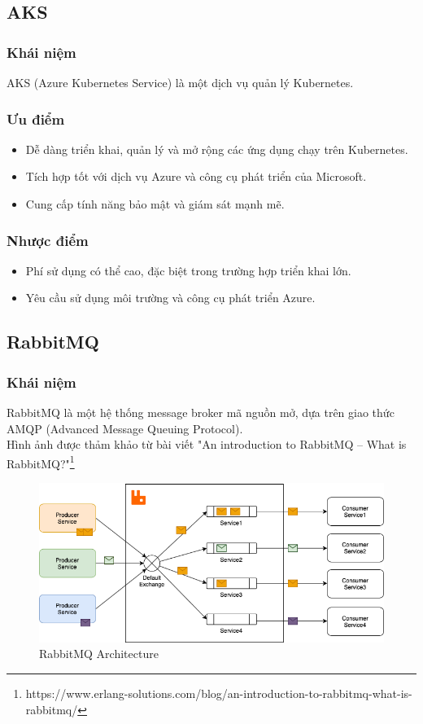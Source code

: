 \subsection{AKS}
\subsubsection{Khái niệm}
\indent AKS (Azure Kubernetes Service) là một dịch vụ quản lý Kubernetes.

\subsubsection{Ưu điểm}
\begin{itemize}
    \item Dễ dàng triển khai, quản lý và mở rộng các ứng dụng chạy trên Kubernetes.
    \item Tích hợp tốt với dịch vụ Azure và công cụ phát triển của Microsoft.
    \item Cung cấp tính năng bảo mật và giám sát mạnh mẽ.
\end{itemize}
\subsubsection{Nhược điểm}
\begin{itemize}
    \item Phí sử dụng có thể cao, đặc biệt trong trường hợp triển khai lớn.
    \item Yêu cầu sử dụng môi trường và công cụ phát triển Azure.
\end{itemize}
\subsection{RabbitMQ}
\subsubsection{Khái niệm}
\indent RabbitMQ là một hệ thống message broker mã nguồn mở, dựa trên giao thức AMQP (Advanced Message Queuing Protocol).\\
Hình ảnh được thảm khảo từ bài viết "An introduction to RabbitMQ – What is RabbitMQ?"\footnote{https://www.erlang-solutions.com/blog/an-introduction-to-rabbitmq-what-is-rabbitmq/} 
\begin{figure}[H]
    \begin{center}
    \includegraphics[scale = 0.5]{images/phat/rabbitMQ.png}
    \vspace*{7mm}
    \caption{RabbitMQ Architecture}
    \end{center}
    \label{}
\end{figure}
